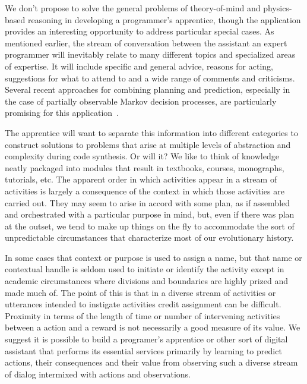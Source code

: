
We don't propose to solve the general problems of theory-of-mind and physics-based reasoning in developing a programmer's apprentice, though the application provides an interesting opportunity to address particular special cases. As mentioned earlier, the stream of conversation between the assistant an expert programmer will inevitably relate to many different topics and specialized areas of expertise. It will include specific and general advice, reasons for acting, suggestions for what to attend to and a wide range of comments and criticisms. Several recent approaches for combining planning and prediction, especially in the case of partially observable Markov decision processes, are particularly promising for this application~\cite{GroshevetalCoRR-17,FinnetalCoRR-17,FoersteretalCoRR-17,WayneetalCoRR-18,SilveretalICML-17}.

The apprentice will want to separate this information into different categories to construct solutions to problems that arise at multiple levels of abstraction and complexity during code synthesis. Or will it? We like to think of knowledge neatly packaged into modules that result in textbooks, courses, monographs, tutorials, etc. The apparent order in which activities appear in a stream of activities is largely a consequence of the context in which those activities are carried out. They may seem to arise in accord with some plan, as if assembled and orchestrated with a particular purpose in mind, but, even if there was plan at the outset, we tend to make up things on the fly to accommodate the sort of unpredictable circumstances that characterize most of our evolutionary history. 

In some cases that context or purpose is used to assign a name, but that name or contextual handle is seldom used to initiate or identify the activity except in academic circumstances where divisions and boundaries are highly prized and made much of. The point of this is that in a diverse stream of activities \emdash{} or utterances intended to instigate activities \emdash{} credit assignment can be difficult. Proximity in terms of the length of time or number of intervening activities between a action and a reward is not necessarily a good measure of its value. We suggest it is possible to build a programer's apprentice or other sort of digital assistant that performs its essential services primarily by learning to predict actions, their consequences and their value from observing such a diverse stream of dialog intermixed with actions and observations. 

